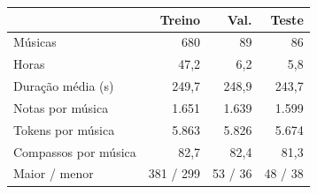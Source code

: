 \begin{tabular}{lrrr}
\toprule
 & Treino & Val. & Teste \\
\midrule
Músicas & 680 & 89 & 86 \\
Horas & 47,2 & 6,2 & 5,8 \\
Duração média (s) & 249,7 & 248,9 & 243,7 \\
Notas por música & 1.651 & 1.639 & 1.599 \\
Tokens por música & 5.863 & 5.826 & 5.674 \\
Compassos por música & 82,7 & 82,4 & 81,3 \\
Maior / menor & 381 / 299 & 53 / 36 & 48 / 38 \\
\bottomrule
\end{tabular}
